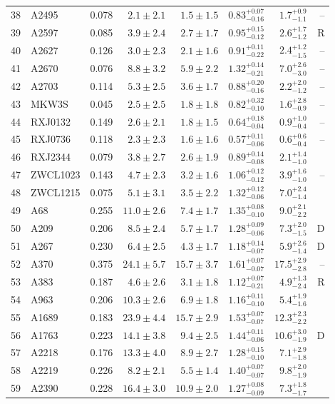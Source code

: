\documentclass[useAMS,usenatbib]{mnras}
\begin{document}
\begin{table}
\begin{tabularx}{1.0\textwidth}{ l l r r r r r r}
38 & A2495 & 0.078 & $2.1 \pm 2.1$ & $1.5 \pm 1.5$ & $0.83_{-0.16}^{+0.07}$ & $1.7_{-1.1}^{+0.9}$ & -- \\
39 & A2597 & 0.085 & $3.9 \pm 2.4$ & $2.7 \pm 1.7$ & $0.95_{-0.12}^{+0.15}$ & $2.6_{-1.2}^{+1.7}$ & R \\
40 & A2627 & 0.126 & $3.0 \pm 2.3$ & $2.1 \pm 1.6$ & $0.91_{-0.22}^{+0.11}$ & $2.4_{-1.5}^{+1.2}$ & -- \\
41 & A2670 & 0.076 & $8.8 \pm 3.2$ & $5.9 \pm 2.2$ & $1.32_{-0.21}^{+0.14}$ & $7.0_{-3.0}^{+2.6}$ & -- \\
42 & A2703 & 0.114 & $5.3 \pm 2.5$ & $3.6 \pm 1.7$ & $0.88_{-0.16}^{+0.20}$ & $2.2_{-1.2}^{+2.0}$ & -- \\
43 & MKW3S & 0.045 & $2.5 \pm 2.5$ & $1.8 \pm 1.8$ & $0.82_{-0.10}^{+0.32}$ & $1.6_{-0.9}^{+2.8}$ & -- \\
44 & RXJ0132 & 0.149 & $2.6 \pm 2.1$ & $1.8 \pm 1.5$ & $0.64_{-0.04}^{+0.18}$ & $0.9_{-0.4}^{+1.0}$ & -- \\
45 & RXJ0736 & 0.118 & $2.3 \pm 2.3$ & $1.6 \pm 1.6$ & $0.57_{-0.06}^{+0.11}$ & $0.6_{-0.4}^{+0.6}$ & -- \\
46 & RXJ2344 & 0.079 & $3.8 \pm 2.7$ & $2.6 \pm 1.9$ & $0.89_{-0.08}^{+0.14}$ & $2.1_{-1.0}^{+1.4}$ &  \\
47 & ZWCL1023 & 0.143 & $4.7 \pm 2.3$ & $3.2 \pm 1.6$ & $1.06_{-0.12}^{+0.12}$ & $3.9_{-1.0}^{+1.6}$ & -- \\
48 & ZWCL1215 & 0.075 & $5.1 \pm 3.1$ & $3.5 \pm 2.2$ & $1.32_{-0.06}^{+0.12}$ & $7.0_{-1.4}^{+2.4}$ &  \\
49 & A68 & 0.255 & $11.0 \pm 2.6$ & $7.4 \pm 1.7$ & $1.35_{-0.10}^{+0.08}$ & $9.0_{-2.2}^{+2.1}$ &  \\
50 & A209 & 0.206 & $8.5 \pm 2.4$ & $5.7 \pm 1.7$ & $1.28_{-0.06}^{+0.09}$ & $7.3_{-1.5}^{+2.0}$ & D \\
51 & A267 & 0.230 & $6.4 \pm 2.5$ & $4.3 \pm 1.7$ & $1.18_{-0.07}^{+0.14}$ & $5.9_{-1.4}^{+2.6}$ & D \\
52 & A370 & 0.375 & $24.1 \pm 5.7$ & $15.7 \pm 3.7$ & $1.61_{-0.07}^{+0.07}$ & $17.5_{-2.8}^{+2.9}$ & -- \\
53 & A383 & 0.187 & $4.6 \pm 2.6$ & $3.1 \pm 1.8$ & $1.12_{-0.21}^{+0.07}$ & $4.9_{-2.4}^{+1.3}$ & R \\
54 & A963 & 0.206 & $10.3 \pm 2.6$ & $6.9 \pm 1.8$ & $1.16_{-0.10}^{+0.11}$ & $5.4_{-1.6}^{+1.9}$ &  \\
55 & A1689 & 0.183 & $23.9 \pm 4.4$ & $15.7 \pm 2.9$ & $1.53_{-0.07}^{+0.07}$ & $12.3_{-2.2}^{+2.3}$ &  \\
56 & A1763 & 0.223 & $14.1 \pm 3.8$ & $9.4 \pm 2.5$ & $1.44_{-0.06}^{+0.11}$ & $10.6_{-1.9}^{+3.0}$ & D \\
57 & A2218 & 0.176 & $13.3 \pm 4.0$ & $8.9 \pm 2.7$ & $1.28_{-0.10}^{+0.15}$ & $7.1_{-1.8}^{+2.9}$ &  \\
58 & A2219 & 0.226 & $8.2 \pm 2.1$ & $5.5 \pm 1.4$ & $1.40_{-0.07}^{+0.07}$ & $9.8_{-1.9}^{+2.0}$ &  \\
59 & A2390 & 0.228 & $16.4 \pm 3.0$ & $10.9 \pm 2.0$ & $1.27_{-0.09}^{+0.08}$ & $7.3_{-1.7}^{+1.8}$ &  \\



\end{tabularx}
\end{table}
\end{document}
